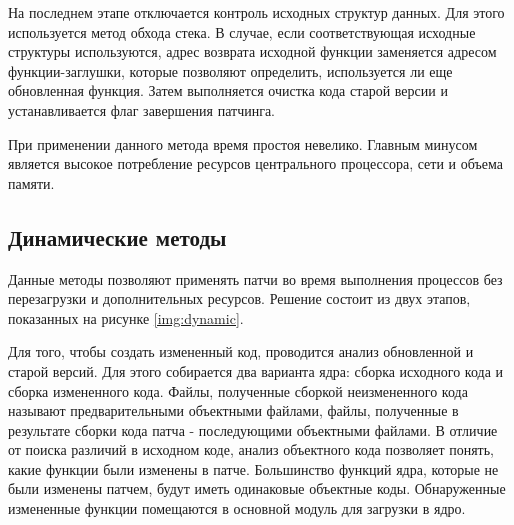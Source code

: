 На последнем этапе отключается контроль исходных структур данных. Для этого используется метод обхода стека. В случае, если соответствующая исходные структуры используются, адрес возврата исходной функции заменяется адресом функции-заглушки, которые позволяют определить, используется ли еще обновленная функция. Затем выполняется очистка кода старой версии и устанавливается флаг завершения патчинга.

При применении данного метода время простоя невелико. Главным минусом является высокое потребление ресурсов центрального процессора, сети и объема памяти.

\subsection{Динамические методы}

Данные методы \cite{ksplice} \cite{dynamos} позволяют применять патчи во время выполнения процессов без перезагрузки и дополнительных ресурсов. Решение состоит из двух этапов, показанных на рисунке \ref{img:dynamic}.

Для того, чтобы создать измененный код, проводится анализ обновленной и старой	версий. Для этого собирается два варианта ядра: сборка исходного кода и сборка измененного кода. Файлы, полученные сборкой неизмененного кода называют предварительными объектными файлами, файлы, полученные в результате сборки кода патча - последующими объектными файлами. В отличие от поиска различий в исходном коде, анализ объектного кода позволяет понять, какие функции были изменены в патче. Большинство функций ядра, которые не были изменены патчем, будут иметь одинаковые объектные коды. Обнаруженные измененные функции помещаются в основной модуль для загрузки в ядро.

